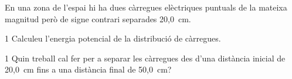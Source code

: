 En una zona de l'espai hi ha dues càrregues elèctriques puntuals de la mateixa magnitud però de signe contrari separades 20,0~cm.

\begin{apartat}{1}
Calculeu l'energia potencial de la distribució de càrregues.
\end{apartat}

\begin{apartat}{1}
Quin treball cal fer per a separar les càrregues des d'una distància inicial de 20,0~cm fins a una distància final de 50,0~cm?
\end{apartat}

